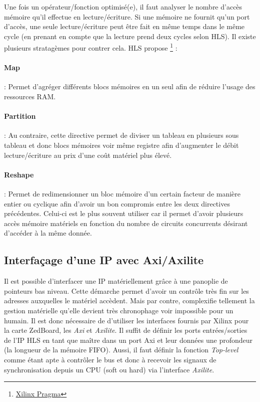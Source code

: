 \documentclass[12pt,a4paper]{article}
\begin{document}
Une fois un opérateur/fonction optimisé(e), il faut analyser le nombre d'accès mémoire qu'il effectue en lecture/écriture. Si une mémoire ne fournit qu'un port d'accès, une seule lecture/écriture peut être fait en même temps dans le même cycle (en prenant en compte que la lecture prend deux cycles selon HLS). Il existe plusieurs stratagèmes pour contrer cela. HLS propose \footnote{\href{https://japan.xilinx.com/html\_docs/xilinx2017\_4/sdaccel\_doc/okr1504034364623.html}{Xilinx Pragma}} :
\paragraph{Map} : Permet d'agréger différents blocs mémoires en un seul afin de réduire l'usage des ressources RAM.
\paragraph{Partition} : Au contraire, cette directive permet de diviser un tableau en plusieurs sous tableau et donc blocs mémoires voir même registre afin d'augmenter le débit lecture/écriture au prix d'une coût matériel plus élevé.
\paragraph{Reshape} : Permet de redimensionner un bloc mémoire d'un certain facteur de manière entier ou cyclique afin d'avoir un bon compromis entre les deux directives précédentes. Celui-ci est le plus souvent utiliser car il permet d'avoir plusieurs accès mémoire matériels en fonction du nombre de circuits concurrents désirant d'accéder à la même donnée.

\subsection{Interfaçage d'une IP avec Axi/Axilite}
Il est possible d'interfacer une IP matériellement grâce à une panoplie de pointeurs bas niveau. Cette démarche permet d'avoir un contrôle très fin sur les adresses auxquelles le matériel accèdent. Mais par contre, complexifie tellement la gestion matérielle qu'elle devient très chronophage voir impossible pour un humain. Il est donc nécessaire de d'utiliser les interfaces fournis par Xilinx pour la carte ZedBoard, les \textit{Axi} et \textit{Axilite}. Il suffit de définir les ports entrées/sorties de l'IP HLS en tant que maître dans un port Axi et leur données une profondeur (la longueur de la mémoire FIFO). Aussi, il faut définir la fonction \textit{Top-level} comme étant apte à contrôler le bus et donc à recevoir les signaux de synchronisation depuis un CPU (soft ou hard) via l'interface \textit{Axilite}.
\end{document}
